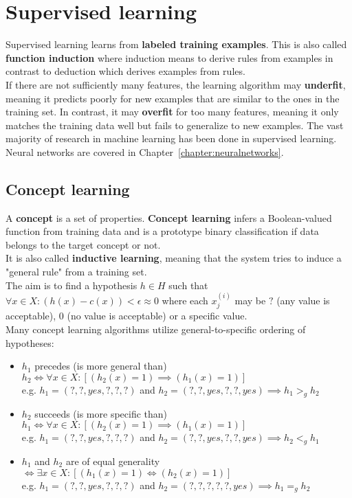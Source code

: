 \documentclass{report}
\begin{document}
\chapter{Supervised learning}
Supervised learning learns from {\bf labeled training examples}. 
This is also called {\bf function induction} where induction means to derive rules from examples in contrast to deduction which derives examples from rules.
\\
If there are not sufficiently many features, the learning algorithm may {\bf underfit}, meaning it predicts poorly for new examples that are similar to the ones in the training set.
In contrast, it may {\bf overfit} for too many features, meaning it only matches the training data well but fails to generalize to new examples.
The vast majority of research in machine learning has been done in supervised learning.
\\
Neural networks are covered in Chapter~\ref{chapter:neuralnetworks}.

\section{Concept learning}
A {\bf concept} is a set of properties.
{\bf Concept learning} infers a Boolean-valued function from training data and is a prototype binary classification if data belongs to the target concept or not.
\\
It is also called {\bf inductive learning}, meaning that the system tries to induce a "general rule" from a training set.
\\
The aim is to find a hypothesis $h\in H$ such that $\forall x\in X: (h(x) - c(x)) < \epsilon \approx 0$ where each $x^{(i)}_j$ may be $?$ (any value is acceptable), $0$ (no value is acceptable) or a specific value.
\\
Many concept learning algorithms utilize general-to-specific ordering of hypotheses:
\begin{itemize}
\item $h_1$ precedes (is more general than) $h_2 \iff \forall x\in X: [(h_2(x)=1)\implies (h_1(x)=1)]$ \\
e.g. $h_1 = (?,?,yes,?,?,?)$ and $h_2 = (?,?,yes,?,?,yes) \implies h_1 >_g h_2$
\item $h_2$ succeeds (is more specific than) $h_1 \iff \forall x\in X: [(h_2(x)=1)\implies (h_1(x)=1)]$ \\
e.g. $h_1 = (?,?,yes,?,?,?)$ and $h_2 = (?,?,yes,?,?,yes)  \implies h_2 <_g h_1$
\item $h_1$ and $h_2$ are of equal generality $\iff \exists x\in X: [(h_1(x)=1)\iff (h_2(x)=1)]$ \\
e.g. $h_1 = (?,?,yes,?,?,?)$ and $h_2 = (?,?,?,?,?,yes) \implies h_1 =_g h_2$
\end{itemize}
\end{document}
